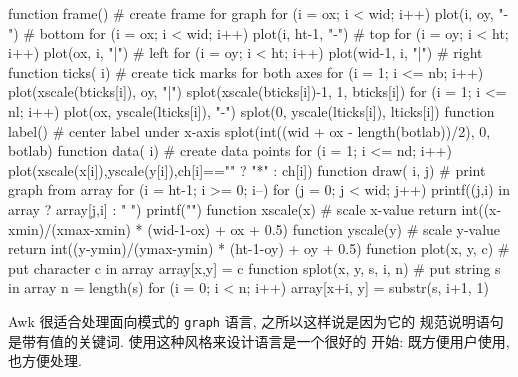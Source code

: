 \begin{awkcode}
    function frame() {        # create frame for graph
        for (i = ox; i < wid; i++) plot(i, oy, "-")     # bottom
        for (i = ox; i < wid; i++) plot(i, ht-1, "-")   # top
        for (i = oy; i < ht; i++) plot(ox, i, "|")      # left
        for (i = oy; i < ht; i++) plot(wid-1, i, "|")   # right
    }
    function ticks(    i) {   # create tick marks for both axes
        for (i = 1; i <= nb; i++) {
            plot(xscale(bticks[i]), oy, "|")
            splot(xscale(bticks[i])-1, 1, bticks[i])
        }
        for (i = 1; i <= nl; i++) {
            plot(ox, yscale(lticks[i]), "-")
            splot(0, yscale(lticks[i]), lticks[i])
        }
    }
    function label() {        # center label under x-axis
        splot(int((wid + ox - length(botlab))/2), 0, botlab)
    }
    function data(    i) {    # create data points
        for (i = 1; i <= nd; i++)
            plot(xscale(x[i]),yscale(y[i]),ch[i]=="" ? "*" : ch[i])
    }
    function draw(    i, j) { # print graph from array
        for (i = ht-1; i >= 0; i--) {
            for (j = 0; j < wid; j++)
                printf((j,i) in array ? array[j,i] : " ")
            printf("\n")
        }
    }
    function xscale(x) {      # scale x-value
        return int((x-xmin)/(xmax-xmin) * (wid-1-ox) + ox + 0.5)
    }
    function yscale(y) {      # scale y-value
        return int((y-ymin)/(ymax-ymin) * (ht-1-oy) + oy + 0.5)
    }
    function plot(x, y, c) {  # put character c in array
        array[x,y] = c
    }
    function splot(x, y, s,    i, n) { # put string s in array
        n = length(s)
        for (i = 0; i < n; i++)
            array[x+i, y] = substr(s, i+1, 1)
    }
\end{awkcode}

Awk 很适合处理面向模式的 \texttt{graph} 语言, 之所以这样说是因为它的
规范说明语句是带有值的关键词. 使用这种风格来设计语言是一个很好的
开始: 既方便用户使用, 也方便处理.

